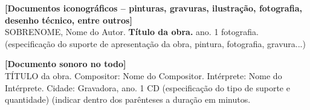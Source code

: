 \bigskip
\noindent\textcolor{docblue}{\textbf{[Documentos iconográficos -- pinturas, gravuras, ilustração, fotografia, desenho técnico, entre outros]}}\\
SOBRENOME, Nome do Autor. \textbf{Título da obra.} ano. 1 fotografia. (especificação do suporte de apresentação da obra, pintura, fotografia, gravura...)

\bigskip
\noindent\textcolor{docblue}{\textbf{[Documento sonoro no todo]}}\\
TÍTULO da obra. Compositor: Nome do Compositor. Intérprete: Nome do Intérprete. Cidade: Gravadora, ano. 1 CD (especificação do tipo de suporte e quantidade) (indicar dentro dos parênteses a duração em minutos.
\endgroup